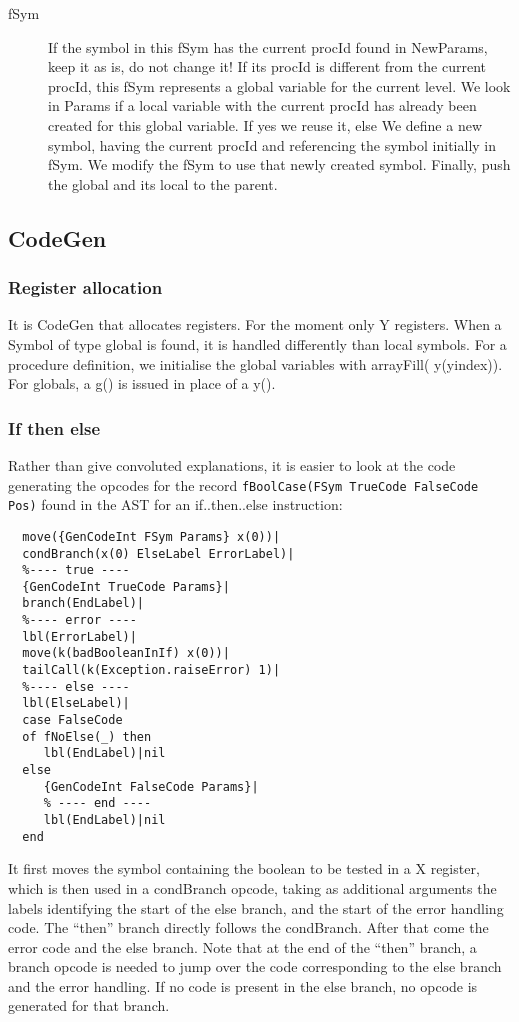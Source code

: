 \documentclass[a4paper]{memoir}
\begin{document}
\begin{description}
   \item[fSym] If the symbol in this fSym has the current procId found in NewParams, keep it as is, do not change it! 
      If its procId is different from the current procId, this fSym represents a global variable for the current level. We look in Params if a local variable with the current procId has already been created for this global variable. If yes we reuse it, else We define a new symbol, having the current procId and referencing the symbol initially in fSym. We modify the fSym to use that newly created symbol. Finally, push the global and its local to the parent.
      
\end{description}



\subsection{CodeGen}
\subsubsection{Register allocation}
It is CodeGen that allocates registers. For the moment only Y registers.
When a Symbol of type global is found, it is handled differently than local symbols.
For a procedure definition, we initialise the global variables with arrayFill( y(yindex)). 
For globals, a g() is issued in place of a y(). 
\subsubsection{If then else}
Rather than give convoluted explanations, it is easier to look at the code generating the opcodes for the record \lstinline!fBoolCase(FSym TrueCode FalseCode Pos)! found in the AST for an if..then..else instruction:
\begin{lstlisting}
  move({GenCodeInt FSym Params} x(0))|
  condBranch(x(0) ElseLabel ErrorLabel)|
  %---- true ----
  {GenCodeInt TrueCode Params}|
  branch(EndLabel)|
  %---- error ----
  lbl(ErrorLabel)|
  move(k(badBooleanInIf) x(0))|
  tailCall(k(Exception.raiseError) 1)|
  %---- else ----
  lbl(ElseLabel)|
  case FalseCode
  of fNoElse(_) then
     lbl(EndLabel)|nil
  else
     {GenCodeInt FalseCode Params}|
     % ---- end ----
     lbl(EndLabel)|nil
  end
\end{lstlisting}
It first moves the symbol containing the boolean to be tested in a X register, which is then used in a condBranch opcode, taking as additional arguments the labels identifying the start of the else branch, and the start of the error handling code. The ``then'' branch directly follows the condBranch. After that come the error code and the else branch. Note that at the end of the ``then'' branch, a branch opcode is needed to jump over the code corresponding to the else branch and the error handling. 
If no code is present in the else branch, no opcode is generated for that branch.
\end{document}
